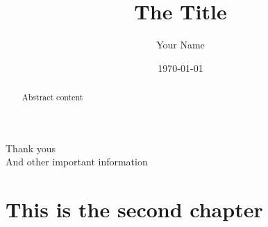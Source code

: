 \documentclass[12pt, a4paper, openright, notitlepage]{report} %
\author{Your Name}
\title{The Title}
\date{\today}
\begin{document}
	\pagestyle{empty}
	\begin{titlepage}
		\maketitle
		\begin{abstract}
			Abstract content
		\end{abstract}
	{} %
	\end{titlepage}

	\cleardoublepage %

	{\centering Thank yous\\}
	\vfill
	And other important information

	\cleardoublepage

	
	\tableofcontents %
	\clearpage
	\listoffigures %
	\clearpage
	\listoftables %
	\clearpage
	\lstlistoflistings %
	\cleardoublepage
	
	\pagestyle{fancy}
	
	
	\chapter{This is the second chapter}
	\lipsum
\end{document}
